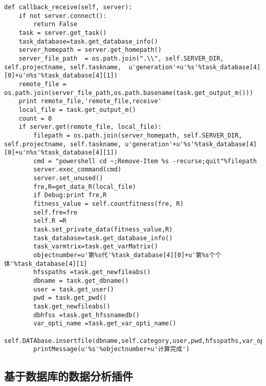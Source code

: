 


\begin{lstlisting}
def callback_receive(self, server):
    if not server.connect():
        return False
    task = server.get_task()
    task_database=task.get_database_info()
    server_homepath = server.get_homepath()
    server_file_path  = os.path.join(".\\", self.SERVER_DIR, self.projectname, self.taskname,  u'generation'+u'%s'%task_database[4][0]+u'n%s'%task_database[4][1])
    remote_file = os.path.join(server_file_path,os.path.basename(task.get_output_m()))
    print remote_file,'remote_file,receive'
    local_file = task.get_output_m()
    count = 0
    if server.get(remote_file, local_file):
        filepath = os.path.join(server_homepath, self.SERVER_DIR, self.projectname, self.taskname, u'generation'+u'%s'%task_database[4][0]+u'n%s'%task_database[4][1])
        cmd = "powershell cd ~;Remove-Item %s -recurse;quit"%filepath
        server.exec_command(cmd)
        server.set_unused()
        fre,R=get_data_R(local_file)
        if Debug:print fre,R
        fitness_value = self.countfitness(fre, R)
        self.fre=fre
        self.R =R
        task.set_private_data(fitness_value,R)
        task_database=task.get_database_info()
        task_varmtrix=task.get_varMatrix()
        objectnumber=u'第%s代'%task_database[4][0]+u'第%s个个体'%task_database[4][1]
        hfsspaths =task.get_newfileabs()
        dbname = task.get_dbname()
        user = task.get_user()
        pwd = task.get_pwd()
        task.get_newfileabs()
        dbhfss =task.get_hfssnamedb()
        var_opti_name =task.get_var_opti_name()
        self.DATAbase.insertfile(dbname,self.category,user,pwd,hfsspaths,var_opti_name,dbhfss,self.fre,task_varmtrix,R)
        printMessage(u'%s'%objectnumber+u'计算完成')
\end{lstlisting}

\subsection{基于数据库的数据分析插件}

